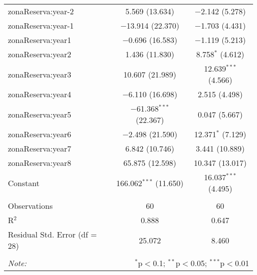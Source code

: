 \documentclass[utf8]{frontiers_suppmat} %
\theoremstyle{definition}
\theoremstyle{definition}
\theoremstyle{definition}
\theoremstyle{remark}
\begin{document}
\begin{table}[!htbp]
\begin{tabular}{@{\extracolsep{1pt}}lcc}
  zonaReserva:year-2 & 5.569 (13.634) & $-$2.142 (5.278) \\ 
  zonaReserva:year-1 & $-$13.914 (22.370) & $-$1.703 (4.431) \\ 
  zonaReserva:year1 & $-$0.696 (16.583) & $-$1.119 (5.213) \\ 
  zonaReserva:year2 & 1.436 (11.830) & 8.758$^{*}$ (4.612) \\ 
  zonaReserva:year3 & 10.607 (21.989) & 12.639$^{***}$ (4.566) \\ 
  zonaReserva:year4 & $-$6.110 (16.698) & 2.515 (4.498) \\ 
  zonaReserva:year5 & $-$61.368$^{***}$ (22.367) & 0.047 (5.667) \\ 
  zonaReserva:year6 & $-$2.498 (21.590) & 12.371$^{*}$ (7.129) \\ 
  zonaReserva:year7 & 6.842 (10.746) & 3.441 (10.889) \\ 
  zonaReserva:year8 & 65.875 (12.598) & 10.347 (13.017) \\ 
  Constant & 166.062$^{***}$ (11.650) & 16.037$^{***}$ (4.495) \\ 
 \hline \\[-1.8ex] 
Observations & 60 & 60 \\ 
R$^{2}$ & 0.888 & 0.647 \\ 
Residual Std. Error (df = 28) & 25.072 & 8.460 \\ 
\hline 
\hline \\[-1.8ex] 
\textit{Note:}  & \multicolumn{2}{r}{$^{*}$p$<$0.1; $^{**}$p$<$0.05; $^{***}$p$<$0.01} \\ 
\end{tabular} 
\end{table}
\end{document}
